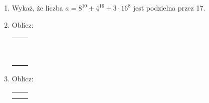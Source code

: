 \documentclass[12pt,a4paper]{article}
\begin{document}
\begin{enumerate}[1.]
	\item Wykaż, że liczba $a=8^{10}+4^{16}+3\cdot16^8$ jest podzielna przez 17.
	\newpage
	\item Oblicz:	
			\begin{enumerate}[a)] \begin{tabular}{p{7cm} p{7cm}}
			\item $\sqrt{36}=$& \vspace{0.4cm}\item $\sqrt{18}=$ \\
			\item $\sqrt{200}=$& \item$\sqrt[3]{27}=$ \\
			\item $\sqrt[3]{250}=$& \item$\sqrt[5]{64}=$ \\
			\item $\sqrt{9}+\sqrt{16}=$& \item$\sqrt{8}+\sqrt{32}=$ \\
			\item $4\sqrt{2}+\sqrt{8}=$& \item$\sqrt{200}-\sqrt{50}=$ \\
			\item $\sqrt{32}-3\sqrt{2}=$& \item$\sqrt{800}+\sqrt{242}-\sqrt{162}=$ \\
			\item $\sqrt{48}-\sqrt{3}=$& \item$\sqrt{12}-\sqrt{27}=$ \\
			\item $3\sqrt{20}-\frac{1}{3}\sqrt{45}-5\sqrt{180}=$& \item$\sqrt{10}\cdot\sqrt{40}=$ \\
			\item $\sqrt{32}:\sqrt{2}=$& \item$\frac{\sqrt{72}}{\sqrt{18}}=$ \\
			
	\end{tabular} \end{enumerate}

	\item Oblicz:
	
		\begin{enumerate}[a)] \begin{tabular}{p{7cm} p{7cm}}
				\item $32^\frac{1}{5}=$& \vspace{0.4cm}\item $4^\frac{1}{2}=$ \\
				\item $\sqrt[3]{2\sqrt{2}}=$& \item$\frac{1}{2\sqrt[3]{2}}\cdot\sqrt[3]{2}^2:2^{-2\frac{1}{2}}=$ \\
				

\end{tabular}
\end{enumerate}
\end{enumerate}
\end{document}
